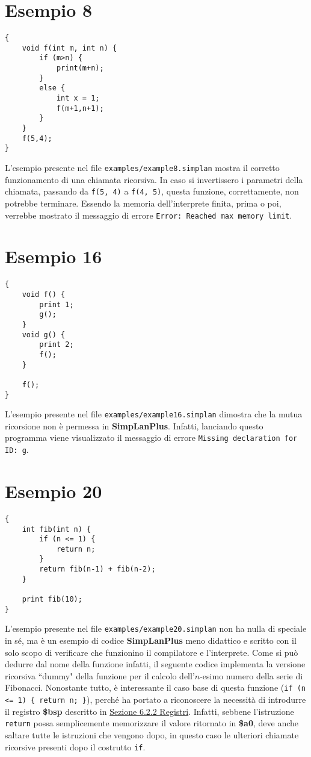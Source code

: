 \documentclass[../report.tex]{subfiles}
\begin{document}
\section{Esempio 8}\label{s:esempio8}
\begin{lstlisting}
{
    void f(int m, int n) {
        if (m>n) {
            print(m+n);
        }
        else {
            int x = 1;
            f(m+1,n+1);
        }
    }
    f(5,4);
}
\end{lstlisting}
L'esempio presente nel file \verb|examples/example8.simplan| mostra il corretto funzionamento di una chiamata ricorsiva.
In caso si invertissero i parametri della chiamata, passando da \verb|f(5, 4)| a \verb|f(4, 5)|, questa funzione, correttamente, non potrebbe terminare.
Essendo la memoria dell'interprete finita, prima o poi, verrebbe mostrato il messaggio di errore \verb|Error: Reached max memory limit|.

\section{Esempio 16}\label{s:esempio16}
\begin{lstlisting}
{
    void f() {
        print 1;
        g();
    }
    void g() {
        print 2;
        f();
    }

    f();
}
\end{lstlisting}
L'esempio presente nel file \verb|examples/example16.simplan| dimostra che la mutua ricorsione non è permessa in \textbf{SimpLanPlus}.
Infatti, lanciando questo programma viene visualizzato il messaggio di errore \verb|Missing declaration for ID: g|.

\section{Esempio 20}\label{s:esempio20}
\begin{lstlisting}
{
    int fib(int n) {
        if (n <= 1) {
            return n;
        }
        return fib(n-1) + fib(n-2);
    }

    print fib(10);
}
\end{lstlisting}
L'esempio presente nel file \verb|examples/example20.simplan| non ha nulla di speciale in sé, ma è un esempio di codice \textbf{SimpLanPlus} meno didattico e scritto con il solo scopo di verificare che funzionino il compilatore e l'interprete.
Come si può dedurre dal nome della funzione infatti, il seguente codice implementa la versione ricorsiva ``dummy" della funzione per il calcolo dell'$n$-esimo numero della serie di Fibonacci.
Nonostante tutto, è interessante il caso base di questa funzione (\verb|if (n <= 1) { return n; }|), perché ha portato a riconoscere la necessità di introdurre il registro \textbf{\$bsp} descritto in \hyperref[ss:registri]{Sezione 6.2.2 Registri}.
Infatti, sebbene l'istruzione \verb|return| possa semplicemente memorizzare il valore ritornato in \textbf{\$a0}, deve anche saltare tutte le istruzioni che vengono dopo, in questo caso le ulteriori chiamate ricorsive presenti dopo il costrutto \verb|if|.
\end{document}

